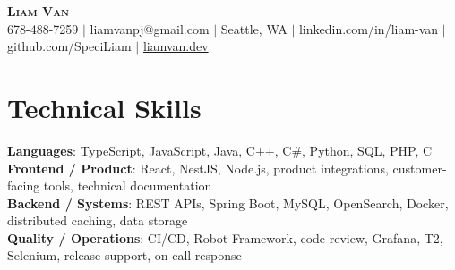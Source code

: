 \documentclass[letterpaper,11pt]{article}
\begin{document}

%
\begin{center}
    \textbf{\Huge \scshape Liam Van} \\ \vspace{1pt}
    \small 678-488-7259 $|$ \small {liamvanpj@gmail.com} $|$ Seattle, WA
 {{$|$ linkedin.com/in/liam-van} {$|$ github.com/SpeciLiam} {$|$ \href{https://liamvan.dev}{liamvan.dev}}}

\end{center}

\section{Technical Skills}
 \begin{itemize}[leftmargin=0.15in, label={}]
    \small{\item{
     \textbf{Languages}{: TypeScript, JavaScript, Java, C++, C\#, Python, SQL, PHP, C} \\
     \textbf{Frontend / Product}{: React, NestJS, Node.js, product integrations, customer-facing tools, technical documentation} \\
     \textbf{Backend / Systems}{: REST APIs, Spring Boot, MySQL, OpenSearch, Docker, distributed caching, data storage} \\
     \textbf{Quality / Operations}{: CI/CD, Robot Framework, code review, Grafana, T2, Selenium, release support, on-call response} \\
    }}
 \end{itemize}
%

\end{document}
